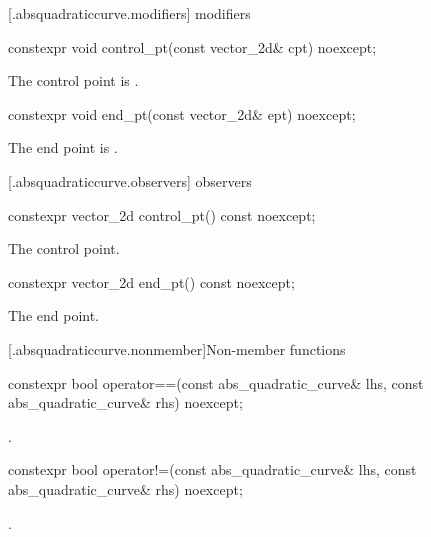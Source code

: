  [\iotwod.absquadraticcurve.modifiers]{ modifiers}

%
\begin{itemdecl}
constexpr void control_pt(const vector_2d& cpt) noexcept;
\end{itemdecl}
\begin{itemdescr}
\pnum
\effects
The control point is .
\end{itemdescr}

%
\begin{itemdecl}
constexpr void end_pt(const vector_2d& ept) noexcept;
\end{itemdecl}
\begin{itemdescr}
\pnum
\effects
The end point is .
\end{itemdescr}

 [\iotwod.absquadraticcurve.observers]{ observers}

%
\begin{itemdecl}
constexpr vector_2d control_pt() const noexcept;
\end{itemdecl}
\begin{itemdescr}
\pnum
\returns
The control point.
\end{itemdescr}

%
\begin{itemdecl}
constexpr vector_2d end_pt() const noexcept;
\end{itemdecl}
\begin{itemdescr}
\pnum
\returns
The end point.
\end{itemdescr}

 [\iotwod.absquadraticcurve.nonmember]{Non-member functions}

%
\begin{itemdecl}
constexpr bool operator==(const abs_quadratic_curve& lhs,
  const abs_quadratic_curve& rhs) noexcept;
\end{itemdecl}
\begin{itemdescr}
\pnum
\returns
{}.
\end{itemdescr}

%
\begin{itemdecl}
constexpr bool operator!=(const abs_quadratic_curve& lhs,
  const abs_quadratic_curve& rhs) noexcept;
\end{itemdecl}
\begin{itemdescr}
\pnum
\returns
{}.
\end{itemdescr}

